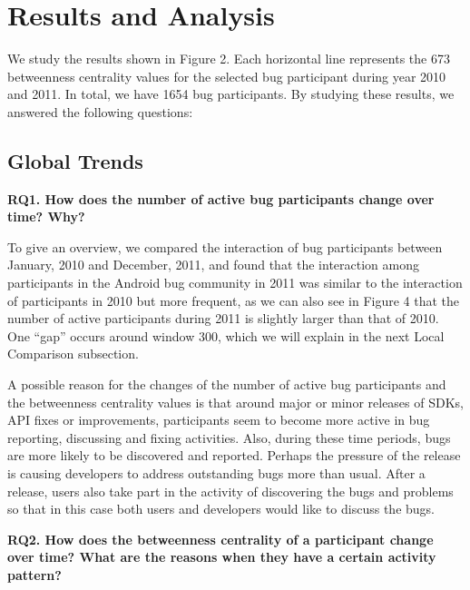 \documentclass[conference]{IEEEtran}
\begin{document}
\section{Results and Analysis}
\label{results}

We study the results shown in Figure 2. Each horizontal line represents the 673 betweenness
centrality values for the selected bug participant during year 2010 and
2011. In total, we have 1654 bug participants. By studying these results, we answered the
following questions:


\subsection{Global Trends}

\textbf{RQ1. How does the number of active bug participants change over time? Why?}

To give an overview, we compared the interaction of bug participants
between January, 2010 and December, 2011, and found that the
interaction among participants in the Android bug community in 2011 was similar
to the interaction of participants in 2010 but more frequent, as we can also see in Figure 4 that the number of active participants
during 2011 is slightly larger than that of 2010. One
``gap'' occurs around window 300,
which we will explain in the next Local Comparison subsection. 

A possible reason for the changes of the number of active bug participants
and the betweenness centrality values is that around major or minor
releases of SDKs, API fixes or improvements, participants seem to become more
active in bug reporting, discussing and fixing
activities. Also, during these time periods, bugs are more likely to
be discovered and reported. 
Perhaps the pressure of the release is 
causing developers to address outstanding bugs more than usual.
After a
release, users also take part in the activity of
discovering the bugs and problems so that in this case both users and
developers would like to discuss the bugs. 


\textbf{RQ2. How does the betweenness centrality of a participant change over time? What are the reasons when they have a certain activity pattern?}
\end{document}

